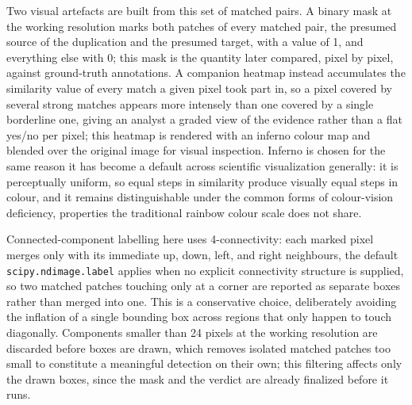 \documentclass[conference]{IEEEtran}
\begin{document}
Two visual artefacts are built from this set of matched pairs. A binary mask at the working resolution marks both patches of every matched pair, the presumed source of the duplication and the presumed target, with a value of 1, and everything else with 0; this mask is the quantity later compared, pixel by pixel, against ground-truth annotations. A companion heatmap instead accumulates the similarity value of every match a given pixel took part in, so a pixel covered by several strong matches appears more intensely than one covered by a single borderline one, giving an analyst a graded view of the evidence rather than a flat yes/no per pixel; this heatmap is rendered with an inferno colour map and blended over the original image for visual inspection. Inferno is chosen for the same reason it has become a default across scientific visualization generally: it is perceptually uniform, so equal steps in similarity produce visually equal steps in colour, and it remains distinguishable under the common forms of colour-vision deficiency, properties the traditional rainbow colour scale does not share.

Connected-component labelling here uses 4-connectivity: each marked pixel merges only with its immediate up, down, left, and right neighbours, the default \texttt{scipy.ndimage.label} applies when no explicit connectivity structure is supplied, so two matched patches touching only at a corner are reported as separate boxes rather than merged into one. This is a conservative choice, deliberately avoiding the inflation of a single bounding box across regions that only happen to touch diagonally. Components smaller than 24 pixels at the working resolution are discarded before boxes are drawn, which removes isolated matched patches too small to constitute a meaningful detection on their own; this filtering affects only the drawn boxes, since the mask and the verdict are already finalized before it runs.
\end{document}

